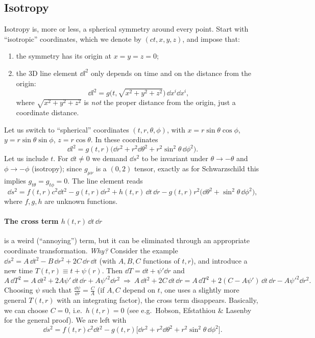 \subsection{Isotropy}
Isotropy is, more or less, a spherical symmetry around every point. Start with ``isotropic'' coordinates, which we denote by $(ct,x,y,z)$, and impose that:
\begin{enumerate}[nosep]
\item the symmetry has its origin at $x=y=z=0$;
\item the 3D line element $\dd l^2$ only depends on time and on the distance from the origin:
\begin{equation}
  \dd l^2=g\big(t,\sqrt{x^2+y^2+z^2}\big)\,\dd x^i\dd x^i ,
\end{equation}
where $\sqrt{x^2+y^2+z^2}$ is \emph{not} the proper distance from the origin, just a coordinate distance.
\end{enumerate}
Let us switch to ``spherical'' coordinates $(t,r,\theta,\phi)$, with $x=r\sin\theta\cos\phi$, $y=r\sin\theta\sin\phi$, $z=r\cos\theta$. In these coordinates
\begin{equation}
  \dd l^2=g(t,r)\big(\dd r^2+r^2\dd\theta^2+r^2\sin^2\theta\,\dd\phi^2\big).
\end{equation}
Let us include $t$. For $\dd t\neq0$ we demand $\dd s^2$ to be invariant under $\theta\to-\theta$ and $\phi\to-\phi$ (isotropy); since $g_{\mu\nu}$ is a $(0,2)$ tensor, exactly as for Schwarzschild this implies $g_{t\theta}=g_{t\phi}=0$. The line element reads
\[
  \dd s^2=f(t,r)c^2\dd t^2-g(t,r)\dd r^2+h(t,r)\,\dd t\,\dd r-g(t,r)r^2\big(\dd\theta^2+\sin^2\theta\,\dd\phi^2\big),
\]
where $f,g,h$ are unknown functions.

\paragraph{The cross term $h(t,r)\,\dd t\,\dd r$} is a weird (``annoying'') term, but it can be eliminated through an appropriate coordinate transformation. \emph{Why?} Consider the example $\dd s^2=A\,\dd t^2-B\,\dd r^2+2C\,\dd r\,\dd t$ (with $A,B,C$ functions of $t,r$), and introduce a new time $T(t,r)\equiv t+\psi(r)$. Then $\dd T=\dd t+\psi'\dd r$ and
\[
  A\,\dd T^2=A\,\dd t^2+2A\psi'\,\dd t\,\dd r+A\psi'^2\dd r^2\ \Longrightarrow\
  A\,\dd t^2+2C\,\dd t\,\dd r=A\,\dd T^2+2(C-A\psi')\,\dd t\,\dd r-A\psi'^2\dd r^2 .
\]
Choosing $\psi$ such that $\frac{\dd\psi}{\dd r}=\frac CA$ (if $A,C$ depend on $t$, one uses a slightly more general $T(t,r)$ with an integrating factor), the cross term disappears. Basically, we can choose $C=0$, i.e.\ $h(t,r)=0$ (see e.g.\ Hobson, Efstathiou \& Lasenby for the general proof). We are left with
\begin{equation}
  \dd s^2=f(t,r)c^2\dd t^2-g(t,r)\big[\dd r^2+r^2\dd\theta^2+r^2\sin^2\theta\,\dd\phi^2\big].
\end{equation}


